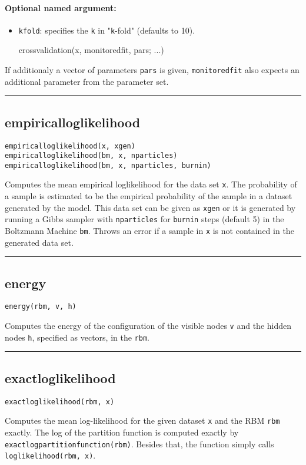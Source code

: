\paragraph*{Optional named argument:}
\begin{itemize}
\item \texttt{kfold}: specifies the \texttt{k} in "\texttt{k}-fold" (defaults to 10).

crossvalidation(x, monitoredfit, pars; ...)

\end{itemize}
If additionaly a vector of parameters \texttt{pars} is given, \texttt{monitoredfit} also expects an additional parameter from the parameter set.

\noindent\rule{\textwidth}{1pt}
\subsection*{empiricalloglikelihood}
\begin{verbatim}
empiricalloglikelihood(x, xgen)
empiricalloglikelihood(bm, x, nparticles)
empiricalloglikelihood(bm, x, nparticles, burnin)
\end{verbatim}
Computes the mean empirical loglikelihood for the data set \texttt{x}. The probability of a sample is estimated to be the empirical probability of the sample in a dataset generated by the model. This data set can be given as \texttt{xgen} or it is generated by running a Gibbs sampler with \texttt{nparticles} for \texttt{burnin} steps (default 5) in the Boltzmann Machine \texttt{bm}. Throws an error if a sample in \texttt{x} is not contained in the generated data set.

\noindent\rule{\textwidth}{1pt}
\subsection*{energy}
\begin{verbatim}
energy(rbm, v, h)
\end{verbatim}
Computes the energy of the configuration of the visible nodes \texttt{v} and the hidden nodes \texttt{h}, specified as vectors, in the \texttt{rbm}.

\noindent\rule{\textwidth}{1pt}
\subsection*{exactloglikelihood}
\begin{verbatim}
exactloglikelihood(rbm, x)
\end{verbatim}
Computes the mean log-likelihood for the given dataset \texttt{x} and the RBM \texttt{rbm} exactly. The log of the partition function is computed exactly by \texttt{exactlogpartitionfunction(rbm)}. Besides that, the function simply calls \texttt{loglikelihood(rbm, x)}.

